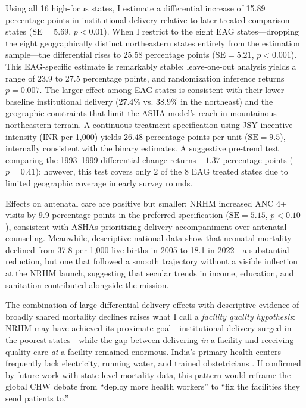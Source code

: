 \documentclass[12pt]{article}
\begin{document}
Using all 16 high-focus states, I estimate a differential increase of 15.89 percentage points in institutional delivery relative to later-treated comparison states ($\text{SE} = 5.69$, $p < 0.01$). When I restrict to the eight EAG states---dropping the eight geographically distinct northeastern states entirely from the estimation sample---the differential rises to 25.58 percentage points ($\text{SE} = 5.21$, $p < 0.001$). This EAG-specific estimate is remarkably stable: leave-one-out analysis yields a range of 23.9 to 27.5 percentage points, and randomization inference returns $p = 0.007$. The larger effect among EAG states is consistent with their lower baseline institutional delivery (27.4\% vs. 38.9\% in the northeast) and the geographic constraints that limit the ASHA model's reach in mountainous northeastern terrain. A continuous treatment specification using JSY incentive intensity (INR per 1,000) yields 26.48 percentage points per unit ($\text{SE} = 9.5$), internally consistent with the binary estimates. A suggestive pre-trend test comparing the 1993--1999 differential change returns $-1.37$ percentage points ($p = 0.41$); however, this test covers only 2 of the 8 EAG treated states due to limited geographic coverage in early survey rounds.

Effects on antenatal care are positive but smaller: NRHM increased ANC 4+ visits by 9.9 percentage points in the preferred specification ($\text{SE} = 5.15$, $p < 0.10$), consistent with ASHAs prioritizing delivery accompaniment over antenatal counseling. Meanwhile, descriptive national data show that neonatal mortality declined from 37.8 per 1,000 live births in 2005 to 18.1 in 2022---a substantial reduction, but one that followed a smooth trajectory without a visible inflection at the NRHM launch, suggesting that secular trends in income, education, and sanitation contributed alongside the mission.

The combination of large differential delivery effects with descriptive evidence of broadly shared mortality declines raises what I call a \emph{facility quality hypothesis}: NRHM may have achieved its proximate goal---institutional delivery surged in the poorest states---while the gap between delivering \emph{in} a facility and receiving quality care \emph{at} a facility remained enormous. India's primary health centers frequently lack electricity, running water, and trained obstetricians \citep{NRHM2012, chokshi2016india}. If confirmed by future work with state-level mortality data, this pattern would reframe the global CHW debate from ``deploy more health workers'' to ``fix the facilities they send patients to.''
\end{document}
